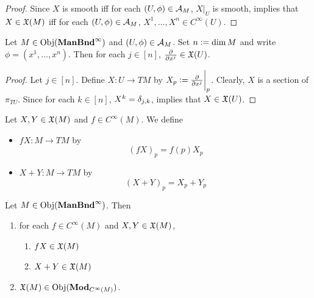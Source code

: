 \documentclass{book}
\begin{document}
\begin{proof}
	Since $X$ is smooth iff for each $(U, \phi) \in \mathcal{A}_M$, $X|_U$ is smooth,  implies that $X \in \mathfrak{X}(M)$ iff for each $(U, \phi) \in \mathcal{A}_M$, $X^1, \ldots, X^n \in C^{\infty}(U)$. 
\end{proof}

\begin{ex}
	Let $M \in \operatorname{Obj}(\operatorname*{\text{\textbf{ManBnd}}^{\infty}})$ and $(U, \phi) \in \mathcal{A}_M$. Set $n \vcentcolon= \dim M$ and write $\phi = (x^1, \ldots, x^n)$. Then for each $j \in [n]$, $\frac{\partial}{\partial x^j} \in \mathfrak{X}(U)$.
\end{ex}

\begin{proof}
	Let $j \in [n]$. Define $X:U \rightarrow TM$ by $X_p \vcentcolon= \frac{\partial}{\partial x^j} \bigg|_p$. Clearly, $X$ is a section of $\pi_{TU}$. Since for each $k \in [n]$, $X^k = \delta_{j,k}$,  implies that $X \in \mathfrak{X}(U)$. 
\end{proof}

\begin{defn}
	Let $X,Y \in \mathfrak{X}(M)$ and $f \in C^{\infty}(M)$. We define 
	\begin{itemize}
		\item $fX : M \rightarrow TM$ by $$(fX)_p = f(p)X_p$$
		\item $X+Y : M \rightarrow TM$ by $$(X+Y)_p = X_p+Y_p$$
	\end{itemize}
\end{defn}

\begin{ex} 
	Let $M \in \operatorname{Obj}(\operatorname*{\text{\textbf{ManBnd}}^{\infty}})$. Then
	\begin{enumerate}
		\item for each $f \in C^{\infty}(M)$ and $X,Y \in \mathfrak{X}(M)$, 
		\begin{enumerate}
			\item $fX \in \mathfrak{X}(M)$
			\item $X+Y \in \mathfrak{X}(M)$
		\end{enumerate}
		\item $\mathfrak{X}(M) \in \operatorname{Obj}(\operatorname*{\text{\textbf{Mod}}}_{C^{\infty}(M)})$.
	\end{enumerate}
\end{ex}
\end{document}
